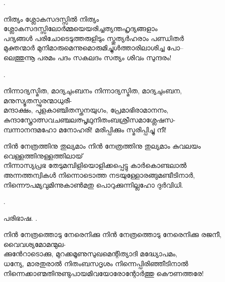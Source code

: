 \begin{enumerate}
 
. 

\begin{slokam}{\VSv}{\UN}{നിത്യം ശ്ലോകസദസ്സിൽ}
നിത്യം ശ്ലോകസദസ്സിലോർമ്മയെയരിച്ചത്യന്തഹൃദ്യങ്ങളാം\\
പദ്യങ്ങള്‍ പരിചോടെടുത്തരുളിടും സ്തുത്യർഹരാം പണ്ഡിതർ\\
മുക്തന്മാർ മുനിമാരുമെന്നുമൊരുമിച്ചുള്‍ത്താരിലാശിച്ച പോ--\\
ലെത്തുന്നൂ പരമം പദം സകലദം സത്യം ശിവം സുന്ദരം!
\end{slokam}


. 


\begin{slokam}{\VSv}{\VKG}{നിന്നാദ്യസ്മിത, മാദ്യചുംബനം}
നിന്നാദ്യസ്മിത, മാദ്യചുംബന, മനുസ്യൂതസ്ഫുരന്മാധുരീ-\\
മന്ദാക്ഷം, പുളകാഞ്ചിതസ്തനയുഗം, പ്രേമാഭിരാമാനനം,\\
കുന്ദാസ്ത്രോത്സവചഞ്ചലത്പൃഥുനിതംബശ്രീസമാശ്ലേഷസ-\\
മ്പന്നാനന്ദമഹോ മനോഹരി! മരിപ്പിക്കും സ്മരിപ്പിച്ചു നീ!
\end{slokam}



\begin{slokam}{\VSv}{\ARRV}{നിന്‍ നേത്രത്തിനു തുല്യമാം}
നിന്‍ നേത്രത്തിനു തുല്യമാം കുവലയം വെള്ളത്തിനുള്ളത്തിലായ്‌\\
നിന്നാസ്യപ്രഭ തേടുമമ്പിളിയൊളിക്കപ്പെട്ടു കാര്‍കൊണ്ടലാല്‍\\
അന്നത്തന്വികള്‍ നിന്നൊടൊത്ത നടയുള്ളോരങ്ങുമണ്ടീടിനാര്‍,\\
നിന്നൌപമ്യവുമിന്നുകാണ്‍മതു പൊറുക്കുന്നില്ലഹോ ദുര്‍വിധി.
\end{slokam}


.

പരിഭാഷ.  .

\begin{slokam}{\VSv}{\Unk}{നിൻ നേത്രത്തൊടു നേരെനിക്കു}
നിൻ നേത്രത്തൊടു നേരെനിക്കു രജനീ, വൈവശ്യമോമന്മുല-\\
ക്കുൻേറാടൊക്കു, മുറക്കമൂണുസുഖമെന്റിത്യാദി മദ്ധ്യോപമം,\\
ധന്യേ, മാരതുരാൽ നിതംബസദൃശം നിന്നെപ്പിരിഞ്ഞീടിനാൽ\\
നിന്നെക്കാണ്മതിനുണ്ടുപായമിവയോരോന്റോർത്തു കൌണത്തരേ!
\end{slokam}



\end{enumerate}
